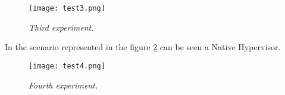 \begin{figure}[!ht]
\begin{center}
\texttt{[image: test3.png]}
\caption{\small \sl Third experiment.\label{fig:test3}}
\end{center}
\end{figure}


In the scenario represented in the figure \ref{fig:test4} can be seen a Native Hypervisor.


\begin{figure}[!ht]
\begin{center}
\texttt{[image: test4.png]}
\caption{\small \sl Fourth experiment.\label{fig:test4}}
\end{center}
\end{figure}


